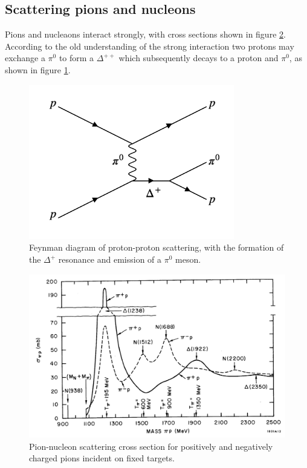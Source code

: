 \subsection{Scattering pions and nucleons}

Pions and nucleaons interact strongly, with cross sections shown in figure \ref{fig:ch2_pionNucleonScattering}.  According to the old understanding of the strong interaction two protons may exchange a $\pi^0$ to form a $\Delta^{++}$ which subsequently decays to a proton and $\pi^0$, as shown in figure \ref{fig:ch2_PPToPPPi0}.

\begin{figure}[!htb]
  \begin{center}
    \includegraphics[width=0.8\textwidth]{images/web_feynman/image_8.png}
    \caption[Feynman diagram of proton-proton scattering]{Feynman diagram of proton-proton scattering, with the formation of the $\Delta^+$ resonance and emission of a $\pi^0$ meson.}
    \label{fig:ch2_PPToPPPi0}
  \end{center}
\end{figure}




\begin{figure}[!htb]
  \begin{center}
    \includegraphics[width=\textwidth]{images/chapter_2/pionNucleonScattering.pdf}
    \caption[Pion-nucleon scattering cross section]{Pion-nucleon scattering cross section for positively and negatively charged pions incident on fixed targets. \cite{pionNucleonScattering}}
    \label{fig:ch2_pionNucleonScattering}
  \end{center}
\end{figure}

